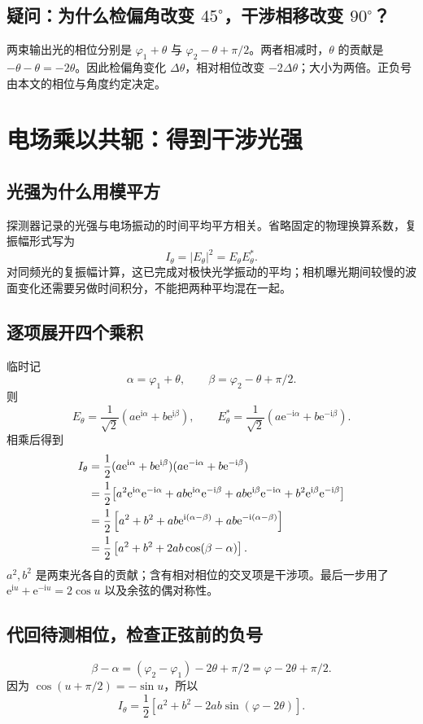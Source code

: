 \documentclass[UTF8,fontset=fandol,11pt,a4paper]{ctexart}
\newcommand{\ii}{\mathrm i}
\newcommand{\ee}{\mathrm e}
\newcommand{\quest}[2]{\subsection*{疑问：#1}#2}
\begin{document}
\quest{为什么检偏角改变 $45^\circ$，干涉相移改变 $90^\circ$？}{
两束输出光的相位分别是 $\varphi_1+\theta$ 与 $\varphi_2-\theta+\pi/2$。两者相减时，$\theta$ 的贡献是 $-\theta-\theta=-2\theta$。因此检偏角变化 $\Delta\theta$，相对相位改变 $-2\Delta\theta$；大小为两倍。正负号由本文的相位与角度约定决定。}

\clearpage
\section{电场乘以共轭：得到干涉光强}
\subsection{光强为什么用模平方}
探测器记录的光强与电场振动的时间平均平方相关。省略固定的物理换算系数，复振幅形式写为
\begin{equation}
I_\theta=|E_\theta|^2=E_\theta E_\theta^*.
\end{equation}
对同频光的复振幅计算，这已完成对极快光学振动的平均；相机曝光期间较慢的波面变化还需要另做时间积分，不能把两种平均混在一起。

\subsection{逐项展开四个乘积}
临时记
\begin{equation}
\alpha=\varphi_1+\theta,\qquad
\beta=\varphi_2-\theta+\pi/2.
\end{equation}
则
\begin{equation}
E_\theta=\frac1{\sqrt2}(a\ee^{\ii\alpha}+b\ee^{\ii\beta}),\qquad
E_\theta^*=\frac1{\sqrt2}(a\ee^{-\ii\alpha}+b\ee^{-\ii\beta}).
\end{equation}
相乘后得到
\begin{align}
I_\theta
&=\frac12(a\ee^{\ii\alpha}+b\ee^{\ii\beta})
(a\ee^{-\ii\alpha}+b\ee^{-\ii\beta})\notag\\
&=\frac12\big[
a^2\ee^{\ii\alpha}\ee^{-\ii\alpha}
+ab\ee^{\ii\alpha}\ee^{-\ii\beta}
+ab\ee^{\ii\beta}\ee^{-\ii\alpha}
+b^2\ee^{\ii\beta}\ee^{-\ii\beta}\big]\notag\\
&=\frac12\left[a^2+b^2
+ab\ee^{\ii(\alpha-\beta)}+ab\ee^{-\ii(\alpha-\beta)}\right]\notag\\
&=\frac12\left[a^2+b^2+2ab\cos(\beta-\alpha)\right].
\end{align}
$a^2,b^2$ 是两束光各自的贡献；含有相对相位的交叉项是干涉项。最后一步用了 $\ee^{\ii u}+\ee^{-\ii u}=2\cos u$ 以及余弦的偶对称性。

\subsection{代回待测相位，检查正弦前的负号}
\begin{equation}
\beta-\alpha=(\varphi_2-\varphi_1)-2\theta+\pi/2
=\varphi-2\theta+\pi/2.
\end{equation}
因为 $\cos(u+\pi/2)=-\sin u$，所以
\begin{equation}
\boxed{I_\theta=\frac12\left[a^2+b^2-2ab\sin(\varphi-2\theta)\right].}
\end{equation}
\end{document}
